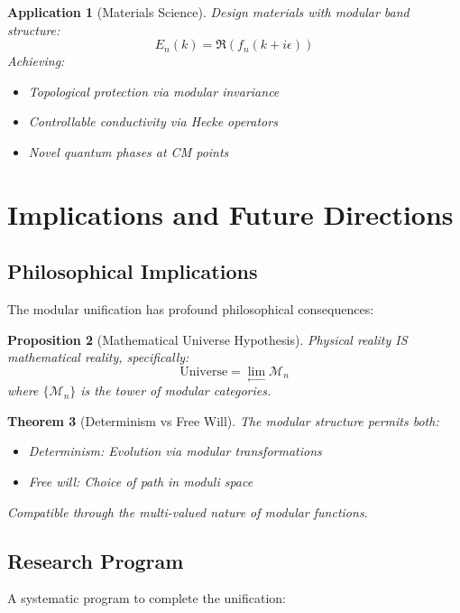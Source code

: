 \documentclass[12pt,a4paper]{article}
\newtheorem{theorem}{Theorem}[section]
\newtheorem{proposition}[theorem]{Proposition}
\newtheorem{application}[theorem]{Application}
\begin{document}
\begin{application}[Materials Science]
Design materials with modular band structure:
\[
E_n(k) = \Re(f_n(k + i\epsilon))
\]
Achieving:
\begin{itemize}
\item Topological protection via modular invariance
\item Controllable conductivity via Hecke operators
\item Novel quantum phases at CM points
\end{itemize}
\end{application}

\section{Implications and Future Directions}

\subsection{Philosophical Implications}

The modular unification has profound philosophical consequences:

\begin{proposition}[Mathematical Universe Hypothesis]
Physical reality IS mathematical reality, specifically:
\[
\text{Universe} = \lim_{\leftarrow} \mathcal{M}_n
\]
where $\{\mathcal{M}_n\}$ is the tower of modular categories.
\end{proposition}

\begin{theorem}[Determinism vs Free Will]
The modular structure permits both:
\begin{itemize}
\item Determinism: Evolution via modular transformations
\item Free will: Choice of path in moduli space
\end{itemize}
Compatible through the multi-valued nature of modular functions.
\end{theorem}

\subsection{Research Program}

A systematic program to complete the unification:
\end{document}
